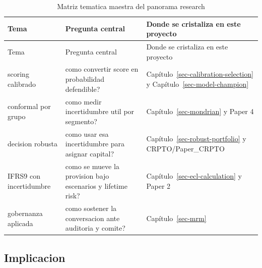\documentclass[
  spanish,
  11pt,
  letterpaper,
]{scrbook}
\theoremstyle{plain}
\theoremstyle{remark}
\begin{document}
\begin{longtable}[]{@{}
  >{\raggedright\arraybackslash}p{}
  >{\raggedright\arraybackslash}p{}
  >{\raggedright\arraybackslash}p{}@{}}
\caption{Matriz tematica maestra del panorama
research}\label{tbl-research-theme-matrix}\tabularnewline
\toprule\noalign{}
\begin{minipage}[b]{\linewidth}\raggedright
Tema
\end{minipage} & \begin{minipage}[b]{\linewidth}\raggedright
Pregunta central
\end{minipage} & \begin{minipage}[b]{\linewidth}\raggedright
Donde se cristaliza en este proyecto
\end{minipage} \\
\midrule\noalign{}
\endfirsthead
\toprule\noalign{}
\begin{minipage}[b]{\linewidth}\raggedright
Tema
\end{minipage} & \begin{minipage}[b]{\linewidth}\raggedright
Pregunta central
\end{minipage} & \begin{minipage}[b]{\linewidth}\raggedright
Donde se cristaliza en este proyecto
\end{minipage} \\
\midrule\noalign{}
\endhead
\bottomrule\noalign{}
\endlastfoot
scoring calibrado & como convertir score en probabilidad defendible? &
Capítulo~\ref{sec-calibration-selection} y
Capítulo~\ref{sec-model-champion} \\
conformal por grupo & como medir incertidumbre util por segmento? &
Capítulo~\ref{sec-mondrian} y Paper 4 \\
decision robusta & como usar esa incertidumbre para asignar capital? &
Capítulo~\ref{sec-robust-portfolio} y CRPTO/Paper\_CRPTO \\
IFRS9 con incertidumbre & como se mueve la provision bajo escenarios y
lifetime risk? & Capítulo~\ref{sec-ecl-calculation} y Paper 2 \\
gobernanza aplicada & como sostener la conversacion ante auditoria y
comite? & Capítulo~\ref{sec-mrm} \\
\end{longtable}

\subsection{Implicacion}\label{implicacion}
\end{document}
